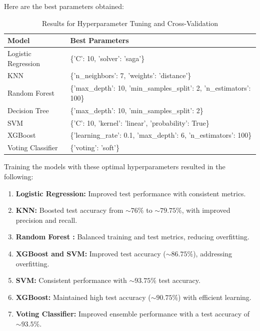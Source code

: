 \documentclass[12pt]{report}
\begin{document}
Here are the best parameters obtained:
\begin{table}[H]
	\centering
	\begin{tabular}{ll}
	\toprule
	\textbf{Model} & \textbf{Best Parameters} \\
	\toprule
	Logistic Regression & \{'C': 10, 'solver': 'saga'\} \\
	\midrule
	KNN & \{'n\_neighbors': 7, 'weights': 'distance'\} \\
	\midrule
	Random Forest & \{'max\_depth': 10, 'min\_samples\_split': 2, 'n\_estimators': 100\} \\
	\midrule
	Decision Tree & \{'max\_depth': 10, 'min\_samples\_split': 2\} \\
	\midrule
	SVM & \{'C': 10, 'kernel': 'linear', 'probability': True\} \\
	\midrule
	XGBoost & \{'learning\_rate': 0.1, 'max\_depth': 6, 'n\_estimators': 100\} \\
	\midrule
	Voting Classifier & \{'voting': 'soft'\} \\
	\bottomrule
	\end{tabular}
	\caption{Results for Hyperparameter Tuning and Cross-Validation}
	\label{table:hyperparameter_tuning}
	\end{table}
\vspace{-1.5em}
\noindent Training the models with these optimal hyperparameters resulted in the following:
\vspace{-1.5em}
\begin{enumerate}
	\setlength\itemsep{-1.5em}
	\item{\textbf{Logistic Regression:}} Improved test performance with consistent metrics.
	\item{\textbf{KNN:}} Boosted test accuracy from $\sim 76\%$ to $\sim 79.75\%$, with improved precision and recall.
	\item{\textbf{Random Forest :}} Balanced training and test metrics, reducing overfitting.
	\item{\textbf{XGBoost and SVM:}} Improved test accuracy ($\sim 86.75\%$), addressing overfitting.
	\item{\textbf{SVM:}} Consistent performance with $\sim 93.75\%$ test accuracy.
	\item{\textbf{XGBoost:}} Maintained high test accuracy ($\sim 90.75\%$) with efficient learning.
	\item{\textbf{Voting Classifier:}} Improved ensemble performance with a test accuracy of $\sim 93.5\%$.

\end{enumerate}
\end{document}
